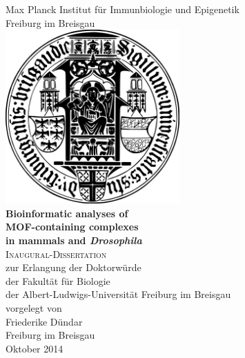 \documentclass[11pt, a4paper, twoside]{Thesis} %
\begin{document}
\begin{titlepage}
\begin{center}

\large Max Planck Institut für Immunbiologie und Epigenetik\\Freiburg im Breisgau \\[1cm]

\includegraphics[width=0.5\textwidth]{Figures/Siegel.png} 
\\[1.3cm]


{\huge \textbf{Bioinformatic analyses of\\MOF-containing complexes\\[9pt]in mammals and \textit{Drosophila}}}\\[1.5cm] %


\textsc{\LARGE Inaugural-Dissertation}\\[1cm] %
\large zur Erlangung der Doktorwürde\\der Fakultät für Biologie\\der Albert-Ludwigs-Universität Freiburg im Breisgau\\[1cm] %

\large vorgelegt von\\Friederike Dündar \\[1.5cm]
 
\large Freiburg im Breisgau \\ Oktober 2014 \\ %

\vfill
\end{center}

\end{titlepage}
\end{document}
